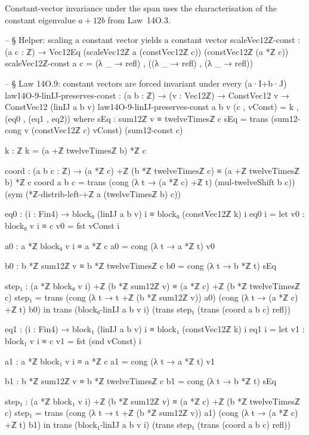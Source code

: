 \documentclass[11pt,a4paper]{book}
\begin{document}
Constant-vector invariance under the span uses the characterisation
of the constant eigenvalue $a+12b$ from Law~14O.3.

\begin{code}
-- § Helper: scaling a constant vector yields a constant vector
scaleVec12ℤ-const : (a c : ℤ) → Vec12Eq (scaleVec12ℤ a (constVec12ℤ c)) (constVec12ℤ (a *ℤ c))
scaleVec12ℤ-const a c = (λ _ → refl) , ((λ _ → refl) , (λ _ → refl))

-- § Law 14O.9: constant vectors are forced invariant under every (a·I+b·J)
law14O-9-linIJ-preserves-const : (a b : ℤ) → (v : Vec12ℤ) → ConstVec12 v → ConstVec12 (linIJ a b v)
law14O-9-linIJ-preserves-const a b v (c , vConst) = k , (eq0 , (eq1 , eq2))
  where
    sEq : sum12ℤ v ≡ twelveTimesℤ c
    sEq = trans (sum12-cong v (constVec12ℤ c) vConst) (sum12-const c)

    k : ℤ
    k = (a +ℤ twelveTimesℤ b) *ℤ c

    coord : (a b c : ℤ) → (a *ℤ c) +ℤ (b *ℤ twelveTimesℤ c) ≡ (a +ℤ twelveTimesℤ b) *ℤ c
    coord a b c =
      trans
        (cong (λ t → (a *ℤ c) +ℤ t) (mul-twelveShift b c))
        (sym (*ℤ-distrib-left-+ℤ a (twelveTimesℤ b) c))

    eq0 : (i : Fin4) → block₀ (linIJ a b v) i ≡ block₀ (constVec12ℤ k) i
    eq0 i =
      let
        v0 : block₀ v i ≡ c
        v0 = fst vConst i

        a0 : a *ℤ block₀ v i ≡ a *ℤ c
        a0 = cong (λ t → a *ℤ t) v0

        b0 : b *ℤ sum12ℤ v ≡ b *ℤ twelveTimesℤ c
        b0 = cong (λ t → b *ℤ t) sEq

        step₁ : (a *ℤ block₀ v i) +ℤ (b *ℤ sum12ℤ v) ≡ (a *ℤ c) +ℤ (b *ℤ twelveTimesℤ c)
        step₁ =
          trans
            (cong (λ t → t +ℤ (b *ℤ sum12ℤ v)) a0)
            (cong (λ t → (a *ℤ c) +ℤ t) b0)
      in
      trans
        (block₀-linIJ a b v i)
        (trans step₁ (trans (coord a b c) refl))

    eq1 : (i : Fin4) → block₁ (linIJ a b v) i ≡ block₁ (constVec12ℤ k) i
    eq1 i =
      let
        v1 : block₁ v i ≡ c
        v1 = fst (snd vConst) i

        a1 : a *ℤ block₁ v i ≡ a *ℤ c
        a1 = cong (λ t → a *ℤ t) v1

        b1 : b *ℤ sum12ℤ v ≡ b *ℤ twelveTimesℤ c
        b1 = cong (λ t → b *ℤ t) sEq

        step₁ : (a *ℤ block₁ v i) +ℤ (b *ℤ sum12ℤ v) ≡ (a *ℤ c) +ℤ (b *ℤ twelveTimesℤ c)
        step₁ =
          trans
            (cong (λ t → t +ℤ (b *ℤ sum12ℤ v)) a1)
            (cong (λ t → (a *ℤ c) +ℤ t) b1)
      in
      trans
        (block₁-linIJ a b v i)
        (trans step₁ (trans (coord a b c) refl))


\end{code}
\end{document}
